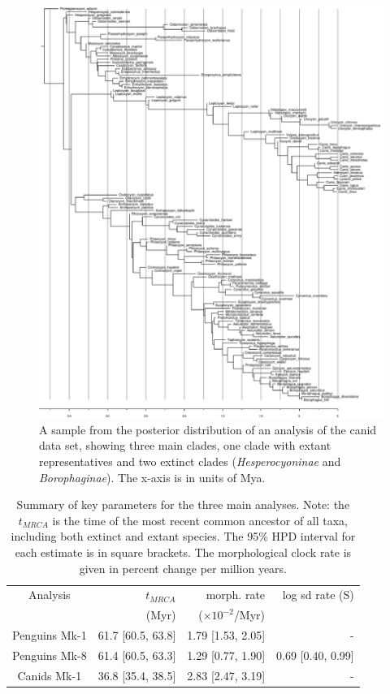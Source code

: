 \documentclass[11pt]{article}
\begin{document}
\begin{figure}
\includegraphics[width=15cm]{canids/stratRanges/1_canids_ranges_3_subset-1460502871266-tree10001.pdf}
\caption{\label{fig:canidTree} A sample from the posterior distribution of an analysis of the canid data set, 
showing three main clades, one clade with extant representatives and two extinct clades ({\it Hesperocyoninae} and {\it Borophaginae}). The x-axis is in units of Mya. }
\end{figure}

\begin{table}[ht]
\centering
\begin{tabular}{c|rrr}
  \hline
Analysis & $t_{MRCA}$ & morph. rate  & log sd rate (S) \\ 
 & (Myr) & ($\times 10^{-2}$/Myr) & \\
  \hline
Penguins Mk-1 & 61.7 [60.5, 63.8] & 1.79 [1.53, 2.05] & -  \\
Penguins Mk-8 & 61.4 [60.5, 63.3] & 1.29 [0.77, 1.90] & 0.69 [0.40, 0.99] \\
  \hline
Canids Mk-1 &  36.8 [35.4, 38.5] & 2.83 [2.47, 3.19] & - \\
\hline
  \end{tabular}
\caption{Summary of key parameters for the three main analyses. Note: the $t_{MRCA}$ is the time of the most recent common ancestor of all taxa, including both extinct and extant species. The 95\% HPD interval for each estimate is in square brackets. The morphological clock rate is given in percent change per million years.} 
\label{estimatesTable}
\end{table}
\end{document}
